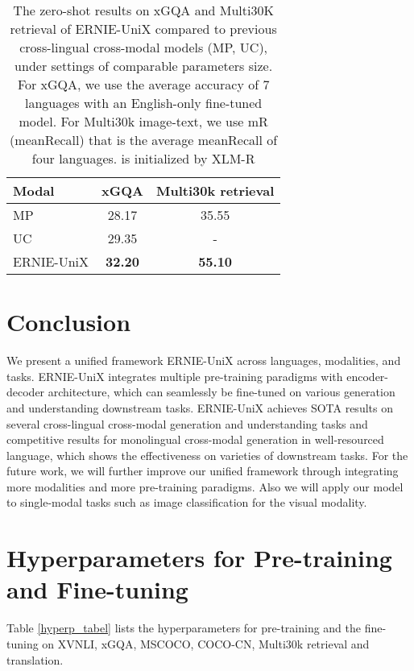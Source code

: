 \documentclass{article}
\begin{document}
\begin{table}[]
\centering

\centering


\begin{tabular}{@{}l|cc@{}}
\toprule
Modal & xGQA           & Multi30k retrieval \\ \midrule
MP   & 28.17          & 35.55              \\
UC   & 29.35          & -              \\
ERNIE-UniX & \textbf{32.20} & \textbf{55.10}     \\ \bottomrule
\end{tabular}
\caption{The zero-shot results on xGQA and Multi30K retrieval  of ERNIE-UniX compared to previous cross-lingual cross-modal models (MP, UC),  under settings of comparable parameters size. For xGQA, we use the average accuracy of 7 languages with an English-only fine-tuned model. For Multi30k image-text, we use mR (meanRecall) that is the average meanRecall of four languages.  is initialized by XLM-R} 

\label{tabel3}

\end{table}



\section{Conclusion}
We present a unified framework ERNIE-UniX  across languages, modalities, and tasks. ERNIE-UniX integrates multiple pre-training paradigms with encoder-decoder architecture, which can seamlessly be fine-tuned on various generation and understanding downstream tasks. ERNIE-UniX  achieves SOTA results on several cross-lingual cross-modal generation and understanding tasks and competitive results for monolingual cross-modal generation in well-resourced language, which shows the effectiveness on varieties of downstream tasks. 
For the future work, we will further improve our unified framework through integrating more modalities and more pre-training paradigms. Also we will apply our model to single-modal tasks such as image classification for the visual modality. 
  
  

\clearpage

\appendix


\section{Hyperparameters for Pre-training and Fine-tuning}
Table \ref{hyperp_tabel} lists the hyperparameters for pre-training and the fine-tuning on XVNLI, xGQA, MSCOCO, COCO-CN, Multi30k retrieval and translation. 
\end{document}
